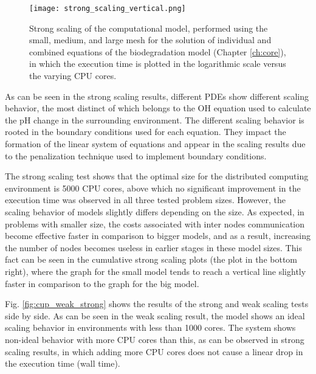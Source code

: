 \begin{figure}[h]
\centering
\medskip
\texttt{[image: strong\_scaling\_vertical.png]}
\caption[Strong scaling of individual and combined components of the biodegradation model]{Strong scaling of the computational model, performed using the small, medium, and large mesh for the solution of individual and combined equations of the biodegradation model (Chapter \ref{ch:core}), in which the execution time is plotted in the logarithmic scale versus the varying \gls{CPU} cores.} \label{fig:cup_strong_scaling}
\end{figure}

\clearpage

As can be seen in the strong scaling results, different \gls{PDE}s show different scaling behavior, the most distinct of which belongs to the OH equation used to calculate the pH change in the surrounding environment. The different scaling behavior is rooted in the boundary conditions used for each equation. They impact the formation of the linear system of equations and appear in the scaling results due to the penalization technique used to implement boundary conditions.

The strong scaling test shows that the optimal size for the distributed computing environment is \num{5000} \gls{CPU} cores, above which no significant improvement in the execution time was observed in all three tested problem sizes. However, the scaling behavior of models slightly differs depending on the size. As expected, in problems with smaller size, the costs associated with inter nodes communication become effective faster in comparison to bigger models, and as a result, increasing the number of nodes becomes useless in earlier stages in these model sizes. This fact can be seen in the cumulative strong scaling plots (the plot in the bottom right), where the graph for the small model tends to reach a vertical line slightly faster in comparison to the graph for the big model.

Fig. \ref{fig:cup_weak_strong} shows the results of the strong and weak scaling tests side by side. As can be seen in the weak scaling result, the model shows an ideal scaling behavior in environments with less than \num{1000} cores. The system shows non-ideal behavior with more \gls{CPU} cores than this, as can be observed in strong scaling results, in which adding more \gls{CPU} cores does not cause a linear drop in the execution time (wall time).

